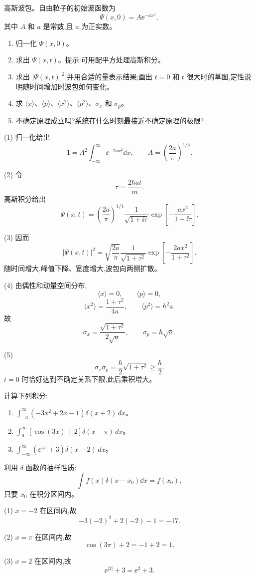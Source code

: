 \begin{question}
高斯波包。自由粒子的初始波函数为
\[
\Psi(x,0)=A\ee^{-ax^2},
\]
其中 $A$ 和 $a$ 是常数,且 $a$ 为正实数。
\begin{enumerate}
\item 归一化 $\Psi(x,0)$。
\item 求出 $\Psi(x,t)$。提示:可用配平方处理高斯积分。
\item 求出 $|\Psi(x,t)|^2$,并用合适的量表示结果;画出 $t=0$ 和 $t$ 很大时的草图,定性说明随时间增加时波包如何变化。
\item 求 $\langle x\rangle$、$\langle p\rangle$、$\langle x^2\rangle$、$\langle p^2\rangle$、$\sigma_x$ 和 $\sigma_p$。
\item 不确定原理成立吗?系统在什么时刻最接近不确定原理的极限?
\end{enumerate}
\end{question}
\begin{solution}
(1) 归一化给出
\[
1=A^2\int_{-\infty}^{\infty}\ee^{-2ax^2}\dd x,
\qquad
A=\left(\frac{2a}{\pi}\right)^{1/4}.
\]

(2) 令
\[
\tau=\frac{2\hbar at}{m}.
\]
高斯积分给出
\[
\Psi(x,t)=\left(\frac{2a}{\pi}\right)^{1/4}\frac1{\sqrt{1+\ii\tau}}
\exp\left[-\frac{a x^2}{1+\ii\tau}\right].
\]

(3) 因而
\[
|\Psi(x,t)|^2=\sqrt{\frac{2a}{\pi}}\frac1{\sqrt{1+\tau^2}}
\exp\left[-\frac{2ax^2}{1+\tau^2}\right].
\]
随时间增大,峰值下降、宽度增大,波包向两侧扩散。

(4) 由偶性和动量空间分布,
\[
\langle x\rangle=0,
\qquad \langle p\rangle=0,
\]
\[
\langle x^2\rangle=\frac{1+\tau^2}{4a},
\qquad
\langle p^2\rangle=\hbar^2a.
\]
故
\[
\sigma_x=\frac{\sqrt{1+\tau^2}}{2\sqrt a},
\qquad
\sigma_p=\hbar\sqrt a.
\]

(5) 
\[
\sigma_x\sigma_p=\frac\hbar2\sqrt{1+\tau^2}\ge\frac\hbar2.
\]
$t=0$ 时恰好达到不确定关系下限,此后乘积增大。
\end{solution}

\begin{question}
计算下列积分:
\begin{enumerate}
\item $\displaystyle \int_{-3}^{\infty}(-3x^2+2x-1)\delta(x+2)\,dx$。
\item $\displaystyle \int_{0}^{\infty}[\cos(3x)+2]\delta(x-\pi)\,dx$。
\item $\displaystyle \int_{-\infty}^{\infty}(\ee^{|x|}+3)\delta(x-2)\,dx$。
\end{enumerate}
\end{question}
\begin{solution}
利用 $\delta$ 函数的抽样性质:
\[
\int f(x)\delta(x-x_0)\dd x=f(x_0),
\]
只要 $x_0$ 在积分区间内。

(1) $x=-2$ 在区间内,故
\[
-3(-2)^2+2(-2)-1=-17.
\]

(2) $x=\pi$ 在区间内,故
\[
\cos(3\pi)+2=-1+2=1.
\]

(3) $x=2$ 在区间内,故
\[
\ee^{|2|}+3=\ee^2+3.
\]
\end{solution}

